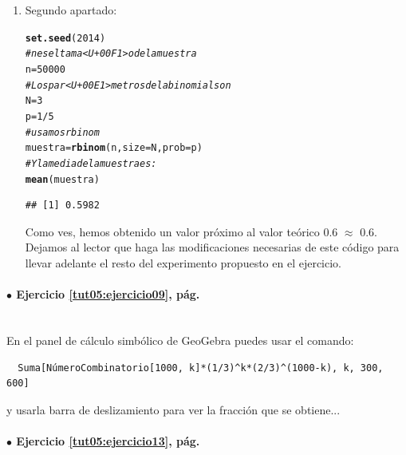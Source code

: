 \documentclass[10pt,a4paper]{article}\usepackage[]{graphicx}\usepackage[]{color}
\makeatletter
\newcommand{\hlnum}[1]{\textcolor[rgb]{0.686,0.059,0.569}{#1}}%
\newcommand{\hlcom}[1]{\textcolor[rgb]{0.678,0.584,0.686}{\textit{#1}}}%
\newcommand{\hlopt}[1]{\textcolor[rgb]{0,0,0}{#1}}%
\newcommand{\hlstd}[1]{\textcolor[rgb]{0.345,0.345,0.345}{#1}}%
\newcommand{\hlkwb}[1]{\textcolor[rgb]{0.69,0.353,0.396}{#1}}%
\newcommand{\hlkwc}[1]{\textcolor[rgb]{0.333,0.667,0.333}{#1}}%
\newcommand{\hlkwd}[1]{\textcolor[rgb]{0.737,0.353,0.396}{\textbf{#1}}}%
\newenvironment{kframe}{%
 \def\at@end@of@kframe{}%
 \ifinner\ifhmode%
  \def\at@end@of@kframe{\end{minipage}}%
  \begin{minipage}{\columnwidth}%
 \fi\fi%
 \def\FrameCommand##1{\hskip\@totalleftmargin \hskip-\fboxsep
 \colorbox{shadecolor}{##1}\hskip-\fboxsep
     \hskip-\linewidth \hskip-\@totalleftmargin \hskip\columnwidth}%
 \MakeFramed {\advance\hsize-\width
   \@totalleftmargin\z@ \linewidth\hsize
   \@setminipage}}%
 {\par\unskip\endMakeFramed%
 \at@end@of@kframe}
\newenvironment{knitrout}{}{} %
\makeatother
\begin{document}
\begin{enumerate}
  \item Segundo apartado:
\begin{knitrout}
\color{fgcolor}\begin{kframe}
\begin{alltt}
\hlkwd{set.seed}\hlstd{(}\hlnum{2014}\hlstd{)}
\hlcom{# n es el tama<U+00F1>o de la muestra}
\hlstd{n} \hlkwb{=} \hlnum{50000}
\hlcom{# Los par<U+00E1>metros de la binomial son}
\hlstd{N} \hlkwb{=} \hlnum{3}
\hlstd{p} \hlkwb{=} \hlnum{1}\hlopt{/}\hlnum{5}
\hlcom{# usamos rbinom}
\hlstd{muestra} \hlkwb{=} \hlkwd{rbinom}\hlstd{(n,} \hlkwc{size}\hlstd{=N,} \hlkwc{prob} \hlstd{= p)}
\hlcom{#Y la media de la muestra es:}
\hlkwd{mean}\hlstd{(muestra)}
\end{alltt}
\begin{verbatim}
## [1] 0.5982
\end{verbatim}
\end{kframe}
\end{knitrout}
        Como ves, hemos obtenido un valor próximo al valor teórico 0.6 $\approx$ 0.6. Dejamos al lector que haga las modificaciones necesarias de este código para llevar adelante el resto del experimento propuesto en el ejercicio.

\end{enumerate}

\paragraph{\bf $\bullet$ Ejercicio \ref{tut05:ejercicio09}, pág. \pageref{tut05:ejercicio09}}
\label{tut05:ejercicio09:sol}\quad\\

En el panel de cálculo simbólico de GeoGebra puedes usar el comando:
\begin{verbatim}
  Suma[NúmeroCombinatorio[1000, k]*(1/3)^k*(2/3)^(1000-k), k, 300, 600]
\end{verbatim}
y usarla barra de deslizamiento para ver la fracción que se obtiene...




\paragraph{\bf $\bullet$ Ejercicio \ref{tut05:ejercicio13}, pág. \pageref{tut05:ejercicio13}}
\label{tut05:ejercicio13:sol}\quad\\
\end{document}
